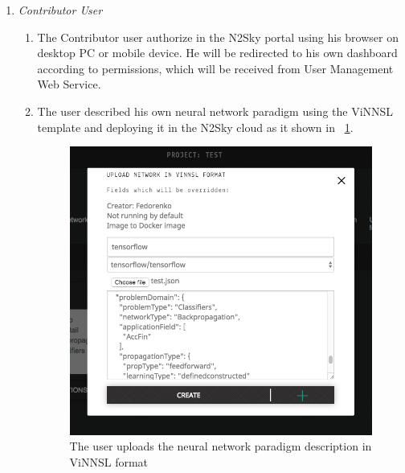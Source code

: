 \documentclass[10pt, conference, compsocconf]{IEEEtran}
\begin{document}
\begin{enumerate}
\item \emph{Contributor User}
\begin{enumerate}
\item The Contributor user authorize in the N2Sky portal using his browser on desktop PC or mobile device. He will be redirected to his own dashboard according to permissions, which will be received from User Management Web Service. 
\item The user described his own neural network paradigm using the ViNNSL template and deploying it in the N2Sky cloud as it shown in ~\ref{fig:own_nn}. 

\begin{figure}[H]
  \includegraphics[width=\linewidth]{img/own_nn.png}
  \caption{The user uploads the neural network paradigm description in ViNNSL format}
  \label{fig:own_nn}
\end{figure}


\end{enumerate}
\end{enumerate}
\end{document}
